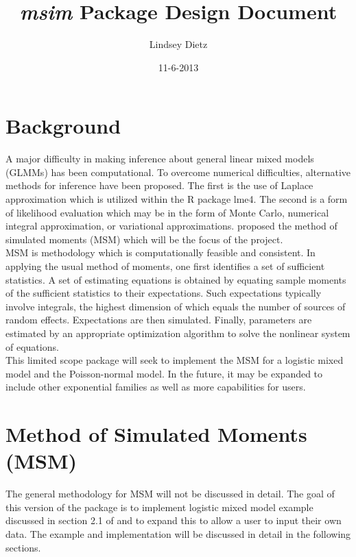 \documentclass[11pt]{article}\usepackage[]{graphicx}\usepackage[]{color}
\title{\vspace{-7ex} \emph{msim} Package Design Document \vspace{-1ex}}
\author{Lindsey Dietz  \vspace{-2ex}}
\date{11-6-2013 \vspace{-2ex}}
\begin{document}
\maketitle
\setlength\parindent{0pt}

\section{Background}

A major difficulty in making inference about general linear mixed models (GLMMs) has been computational. To overcome numerical difficulties, alternative methods for inference have been proposed.  The first is the use of Laplace approximation which is utilized within the R package lme4.  The second is a form of likelihood evaluation which may be in the form of Monte Carlo, numerical integral approximation, or variational approximations.  \cite{jiang} proposed the method of simulated moments (MSM)  which will be the focus of the project.  \\

MSM is methodology which is computationally feasible and consistent.  In applying the usual method of moments, one first identifies a set of sufficient statistics. A set of estimating equations is obtained by equating sample moments of the sufficient statistics to their expectations. Such expectations typically involve integrals, the highest dimension of which equals the number of sources of random effects.  Expectations are then simulated.  Finally, parameters are estimated by an appropriate optimization algorithm to solve the nonlinear system of equations.\\

This limited scope package will seek to implement the MSM for a logistic mixed model and the Poisson-normal model.  In the future, it may be expanded to include other exponential families as well as more capabilities for users.\\

\section{Method of Simulated Moments (MSM)}

The general methodology for MSM will not be discussed in detail.  The goal of this version of the package is to implement logistic mixed model example discussed in section 2.1 of \cite{jiang} and to expand this to allow a user to input their own data.  The example and implementation will be discussed in detail in the following sections.\\
\end{document}
